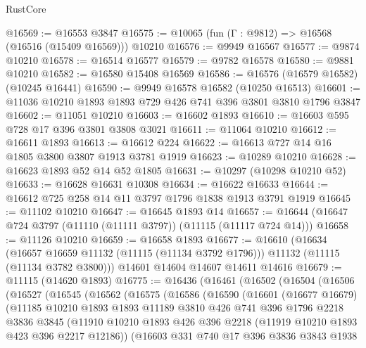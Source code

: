 \begin{lexlean}{RustCore}
\begin{coremodule}
@16569 := @16553 @3847
@16575 := @10065 (fun (Γ : @9812) => @16568 (@16516 (@15409 @16569))) @10210
@16576 := @9949 @16567
@16577 := @9874 @10210
@16578 := @16514 @16577
@16579 := @9782 @16578
@16580 := @9881 @10210
@16582 := @16580 @15408 @16569
@16586 := @16576 (@16579 @16582) (@10245 @16441)
@16590 := @9949 @16578 @16582 (@10250 @16513)
@16601 := @11036 @10210 @1893 @1893 @729 @426 @741 @396 @3801 @3810 @1796 @3847
@16602 := @11051 @10210
@16603 := @16602 @1893
@16610 := @16603 @595 @728 @17 @396 @3801 @3808 @3021
@16611 := @11064 @10210
@16612 := @16611 @1893
@16613 := @16612 @224
@16622 := @16613 @727 @14 @16 @1805 @3800 @3807 @1913 @3781 @1919
@16623 := @10289 @10210
@16628 := @16623 @1893 @52 @14 @52 @1805
@16631 := @10297 (@10298 @10210 @52)
@16633 := @16628 @16631 @10308
@16634 := @16622 @16633
@16644 := @16612 @725 @258 @14 @11 @3797 @1796 @1838 @1913 @3791 @1919
@16645 := @11102 @10210
@16647 := @16645 @1893 @14
@16657 := @16644 (@16647 @724 @3797 (@11110 (@11111 @3797)) (@11115 (@11117 @724 @14)))
@16658 := @11126 @10210
@16659 := @16658 @1893
@16677 := @16610
    (@16634
      (@16657 @16659 @11132 (@11115 (@11134 @3792 @1796)))
      @11132
      (@11115 (@11134 @3782 @3800)))
    @14601
    @14604
    @14607
    @14611
    @14616
@16679 := @11115 (@14620 @1893)
@16775 := @16436
    (@16461
      (@16502
        (@16504
          (@16506
            (@16527
              (@16545
                (@16562
                  (@16575
                    (@16586
                      (@16590
                        (@16601
                          (@16677 @16679)
                          (@11185
                            @10210
                            @1893
                            @1893
                            @11189
                            @3810
                            @426
                            @741
                            @396
                            @1796
                            @2218
                            @3836
                            @3845
                            (@11910
                              @10210
                              @1893
                              @426
                              @396
                              @2218
                              (@11919 @10210 @1893 @423 @396 @2217 @12186))
                            (@16603
                              @331
                              @740
                              @17
                              @396
                              @3836
                              @3843
                              @1938

\end{coremodule}
\end{lexlean}

